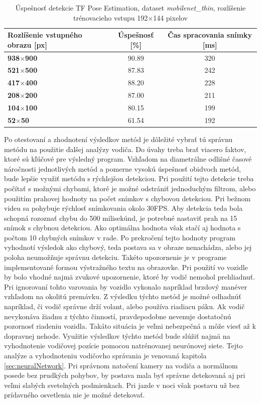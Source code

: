 \documentclass[slovak,master,dept460,male,cpp,cpdeclaration]{diploma}
\begin{document}
\begin{table}[H]
\begin{tabular}{|l|c|c|}
\hline
\textbf{Rozlíšenie vstupného obrazu [px]}        & \textbf{Úspešnosť [\%]}  & \textbf{Čas spracovania snímky [ms]} \\ \hline
\textbf{938$\times$900}      & 90.89     &  320       \\ \hline
\textbf{521$\times$500}      & 87.83     &  242    \\ \hline
\textbf{417$\times$400}      & 88.20     &  228    \\ \hline
\textbf{208$\times$200}      & 87.00     &  211   \\ \hline
\textbf{104$\times$100}      & 80.15     &  199       \\ \hline
\textbf{52$\times$50}       & 61.54    &  192       \\ \hline
\end{tabular}

	\caption{Úspešnosť detekcie TF Pose Estimation, dataset \textit{mobilenet\_thin}, rozlíšenie trénovacieho vstupu 192$\times$144 pixelov}
	\label{tab:tf3}
\end{table}

Po otestovaní a zhodnotení  výsledkov metód  je dôležité vybrať tú správnu metódu na  použitie ďalšej analýzy vodiča. Do úvahy treba brať viacero faktov, ktoré sú kľúčové pre výsledný program. Vzhľadom na diametrálne odlišné časové náročnosti jednotlivých metód a pomerne vysokú úspešnosť obidvoch metód, bude lepšie využiť metódu s rýchlejšou detekciou. Pri použití tejto detekcie treba počítať s možnými chybami, ktoré je možné odstrániť jednoduchým filtrom, alebo použitím  prahovej hodnoty na počet snímkov s chybovou detekciou. Pri bežnom videu sa pohybuje rýchlosť snímkovania okolo 30FPS. Aby detekcia teda  bola schopná rozoznať chybu do 500 milisekúnd, je potrebné nastaviť prah na 15 snímok s chybnou detekciou. Ako optimálna hodnota však stačí aj hodnota s počtom 10 chybných snímkov v rade. Po prekročení tejto hodnoty program vyhodnotí výsledok ako chybový, teda postava sa v obraze nenachádza, alebo jej poloha neumožňuje správnu detekciu. Takéto upozornenie je v programe  implementované formou výstražného textu na obrazovke. Pri použití vo vozidle by bolo vhodné najmä zvukové upozornenie, ktoré by vodič nemohol prehliadnuť.  Pri ignorovaní tohto varovania by vozidlo vykonalo napríklad brzdový  manéver  vzhľadom na okolitú premávku. Z výsledku týchto metód je možné odhadnúť napríklad, či vodič správne drží volant, alebo používa riadiacu páku. Ak  vodič nevykonáva žiadnu z týchto činností, pravdepodobne nevenuje dostatočnú pozornosť riadeniu vozidla. Takáto situácia je veľmi nebezpečná a môže viesť až k dopravnej nehode. Využitie výsledkov týchto metód bude slúžiť najmä na  vyhodnotenie vodičovej pozície pomocou natrénovanej neurónovej siete. Tejto analýze a vyhodnoteniu  vodičovho správania je venovaná kapitola \ref{sec:neuralNetwork}. Pri správnom natočení kamery na vodiča a normálnom posede bez prudkých pohybov, by postava mala byť správne detekovaná aj pri veľmi slabých svetelných podmienkach. Pri jazde v noci však postavu už bez prídavného  osvetlenia nie je možné detekovať.
\end{document}
